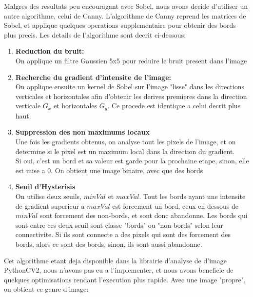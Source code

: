 \documentclass[a4paper, 12pt, titlepage, oneside]{article}
\begin{document}
	Malgres des resultats peu encouragant avec Sobel, nous avons decide d'utiliser un autre algorithme, celui de Canny. L'algorithme de Canny reprend les matrices de Sobel, et applique quelques operations supplementaire pour obtenir des bords plus precis. Les details de l'algorithme sont decrit ci-dessous:
	\begin{enumerate}
		\item \textbf{Reduction du bruit:}\\
			\indent On applique un filtre Gaussien 5x5 pour reduire le bruit present dans l'image
		\item \textbf{Recherche du gradient d'intensite de l'image:}\\  
		 	\indent On applique ensuite un kernel de Sobel sur l'image "lisse" dans les directions verticales et horizontales afin d'obtenir les derives premieres dans
		la direction verticale $G_x$ et horizontales $G_y$. Ce procede est identique a celui decrit plus haut.

		\item \textbf{Suppression des non maximums locaux}\\
			\indent Une fois les gradients obtenus, on analyse tout les pixels de l'image, et on determine si le pixel est un maximum local dans la
			direction du gradient. \\
			Si oui, c'est un bord et sa valeur est garde pour la prochaine etape, sinon, elle est mise a 0. On obtient une image binaire, avec que des bords

		\item \textbf{Seuil d'Hysterisis} \\
			\indent On utilise deux seuils, $minVal$ et $maxVal$. Tout les bords ayant une intensite de gradient superieur a $maxVal$ est forcement un
			bord, ceux en dessous de $minVal$ sont forcement des non-bords, et sont donc abandonne. Les bords qui sont entre ces deux seuil sont classe
			"bords" ou "non-bords" selon leur connectivite. Si ils sont connecte a des pixels qui sont des forcement des bords, alors ce sont des bords,
			sinon, ils sont aussi abandonne.\\
		
	\end{enumerate}
	Cet algorithme etant deja disponible dans la librairie d'analyse de d'image PythonCV2, nous n'avons pas eu a l'implementer, et nous avons beneficie de quelques optimisations rendant l'execution plus rapide.
	Avec une image "propre", on obtient ce genre d'image:\\
\end{document}
